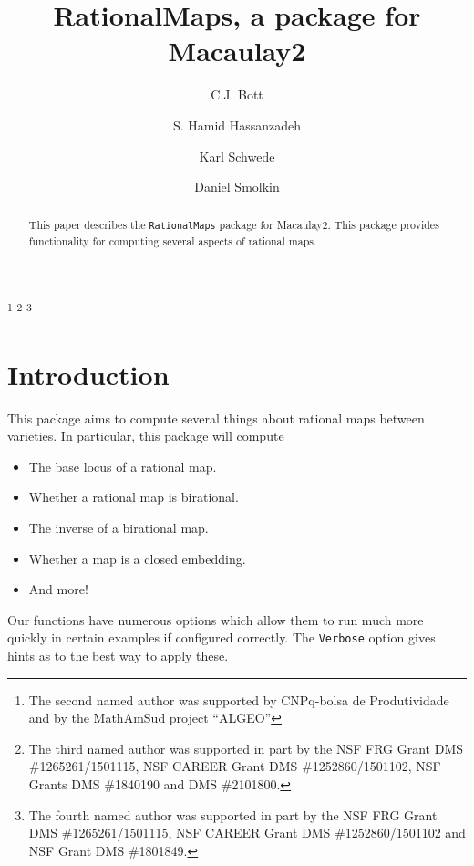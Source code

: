 \documentclass[11pt]{amsart}%
\numberwithin{equation}{theorem}
\renewcommand{\:}{\colon}
\theoremstyle{theorem}
\begin{document}
\title{RationalMaps, a package for Macaulay2}
\author{C.J. Bott}
\author{S. Hamid Hassanzadeh}
\author{Karl Schwede}
\author{Daniel Smolkin}
\address{Department of Mathematics\\Mailstop 3368\\Texas A\&M University\\College Station, TX 77843-3368}
\address{Department of Mathematics\\Federal University of Rio de Janeiro\\Brazil}
\address{Department of Mathematics\\ University of Utah\\ Salt Lake City\\ UT 84112}
\address{Department of Mathematics\\ University of Michigan\\ Ann Arbor\\ UT 48109}

\thanks{The second named author was supported by CNPq-bolsa de Produtividade and by the MathAmSud project ``ALGEO''}
\thanks{The third named author was supported in part by the NSF FRG Grant DMS \#1265261/1501115, NSF CAREER Grant DMS \#1252860/1501102, NSF Grants DMS \#1840190 and DMS \#2101800.}
\thanks{The fourth named author was supported in part by the NSF FRG Grant DMS \#1265261/1501115, NSF CAREER Grant DMS \#1252860/1501102 and NSF Grant DMS \#1801849.}


\begin{abstract}
This paper describes the {\tt RationalMaps} package for Macaulay2.  This package provides functionality for computing several aspects of rational maps.
\end{abstract}
\maketitle


\section{Introduction}


This package aims to compute several things about rational maps between varieties.  In particular, this package will compute
\begin{itemize}
\item{} The base locus of a rational map.
\item{} Whether a rational map is birational.
\item{} The inverse of a birational map.
\item{} Whether a map is a closed embedding.
\item{} And more!
\end{itemize}
Our functions have numerous options which allow them to run much more quickly in certain examples if configured correctly.  The {\tt Verbose} option gives hints as to the best way to apply these.
\end{document}
